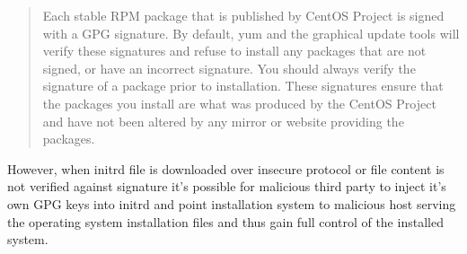 \begin{quote}
Each stable RPM package that is published by CentOS Project is signed
with a GPG signature. By default, yum and the graphical update tools
will verify these signatures and refuse to install any packages that
are not signed, or have an incorrect signature. You should always
verify the signature of a package prior to installation. These
signatures ensure that the packages you install are what was produced
by the CentOS Project and have not been altered by any mirror or
website providing the packages.
\end{quote}

However, when initrd file is downloaded over insecure protocol or file
content is not verified against signature it's possible for malicious
third party to inject it's own GPG keys into initrd and point
installation system to malicious host serving the operating system
installation files and thus gain full control of the installed system.
